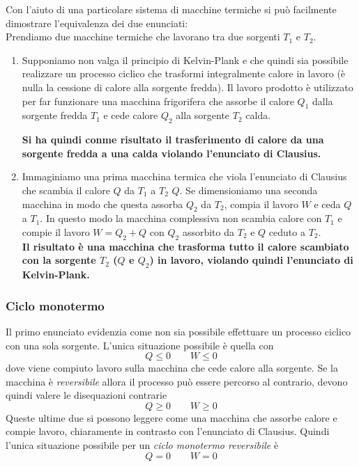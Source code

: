 \documentclass[x11names]{report}
\begin{document}
Con l'aiuto di una particolare sistema di macchine termiche si può facilmente dimostrare l'equivalenza dei due enunciati: \\

\noindent
Prendiamo due macchine termiche che lavorano tra due sorgenti \(T_{1}\)
 e \(T_{2}\).
 \begin{enumerate}
 	\item Supponiamo non valga il principio di Kelvin-Plank e che quindi sia possibile realizzare un processo ciclico  che trasformi integralmente calore in lavoro (è nulla la cessione di calore alla sorgente fredda). Il lavoro prodotto è utilizzato per far funzionare una macchina frigorifera che assorbe il calore \(Q_{1}\) dalla sorgente fredda \(T_{1}\) e cede calore \(Q_{2}\) alla sorgente \(T_{2}\) calda.
 	
 	\textbf{Si ha quindi conme risultato il trasferimento di calore da una sorgente fredda a una calda violando l'enunciato di Clausius.}
 	
 	\item Immaginiamo una prima macchina termica che viola l'enunciato di Clausius che scambia il calore \(Q\) da \(T_{1}\) a \(T_{2}\) \(Q\). Se dimensioniamo una seconda macchina in modo che questa assorba \(Q_{2}\) da \(T_{2}\), compia il lavoro \(W\) e ceda \(Q\) a \(T_{1}\). In questo modo la macchina complessiva non scambia calore con \(T_{1}\) e compie il lavoro \(W = Q_{2} + Q\) con \(Q_{2}\) assorbito  da \(T_{2}\) e \(Q\) ceduto a \(T_{2}\). \\  
 	
 	\textbf{Il risultato è una macchina che trasforma tutto il calore scambiato con la sorgente \(T_{2}\) (\(Q\) e \(Q_{2}\)) in lavoro, violando quindi l'enunciato di Kelvin-Plank.}
 \end{enumerate}
 
 \subsubsection{Ciclo monotermo}
 Il primo enunciato evidenzia come non sia possibile effettuare un processo ciclico con una sola sorgente. L'unica situazione possibile è quella con 
 \[ 
 Q \leq 0 \qquad W \leq 0
 \]
 dove viene compiuto lavoro sulla macchina che cede calore alla sorgente. Se la macchina è \textit{reversibile} allora il processo può essere percorso al contrario, devono quindi valere le disequazioni contrarie
 \[
 Q \geq 0 \qquad W \geq 0
 \]
 Queste ultime due si possono leggere come una macchina che assorbe calore e compie lavoro, chiaramente in contrasto con l'enunciato di Clausius. Quindi l'unica situazione possibile per un \textit{ciclo monotermo reversibile} è 
 \[ 
 Q = 0 \qquad W = 0
 \]
\end{document}
